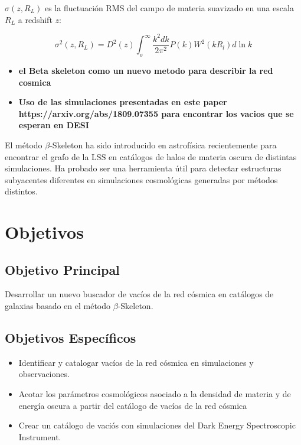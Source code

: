 \documentclass[preprint]{aastex62}
\begin{document}
  $\sigma(z,R_L)$ es la fluctuación RMS del campo de materia suavizado en una escala $R_L$ a
  redshift $z$:
  
  \begin{equation}
    \sigma^2(z,R_L) = D^2(z) \int_o^{\infty} \frac{k^2dk}{2\pi^2}P(k) W^2(kR_l)d \ln k
  \end{equation}



    
  \bigskip

\begin{itemize}
  \item {\bf el Beta skeleton como un nuevo metodo para describir la
    red cosmica}
\item {\bf Uso de las simulaciones presentadas en este paper
  https://arxiv.org/abs/1809.07355 para encontrar los vacios que se
  esperan en DESI}
\end{itemize}

\bigskip



  El método $\beta$-Skeleton ha sido introducido en astrofísica recientemente \citep{Fang2018} para
  encontrar el grafo de la LSS en catálogos de halos de materia oscura de distintas simulaciones.
  Ha probado ser una herramienta útil para detectar estructuras subyacentes diferentes en
  simulaciones cosmológicas generadas por métodos distintos.



  
  \section{Objetivos}

  \subsection{Objetivo Principal}
  Desarrollar un nuevo buscador de vacíos de la red cósmica en catálogos de galaxias
  basado en el método $\beta$-Skeleton.
  
  \subsection{Objetivos Específicos}

  \begin{itemize}    
      \item Identificar y catalogar vacíos de la red cósmica en
        simulaciones y observaciones.
      \item Acotar los parámetros cosmológicos asociado a la densidad
        de materia y de energía oscura a partir del catálogo de
        vacíos de la red cósmica
    \item  Crear un cat\'alogo de vaci\'os con simulaciones del Dark
      Energy Spectroscopic Instrument.
  \end{itemize}
  
\end{document}
